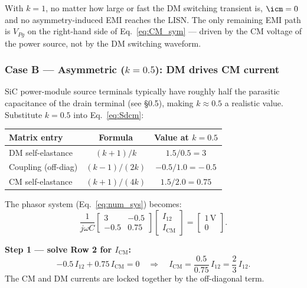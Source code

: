 \begin{statebox}
With $k = 1$, no matter how large or fast the DM switching
transient is, $\icm = 0$ and no asymmetry-induced EMI reaches the
LISN.  The only remaining EMI path is $V_{Pg}$ on the right-hand
side of Eq.~\eqref{eq:CM_sym} — driven by the CM voltage of the
power source, not by the DM switching waveform.
\end{statebox}

\subsubsection*{Case B — Asymmetric ($k = 0.5$): DM drives CM current}

SiC power-module source terminals typically have roughly half the
parasitic capacitance of the drain terminal (see \S0.5), making
$k \approx 0.5$ a realistic value.
Substitute $k = 0.5$ into Eq.~\eqref{eq:Sdcm}:

\begin{center}
\renewcommand{\arraystretch}{1.5}
\begin{tabular}{lcc}
\toprule
Matrix entry & Formula & Value at $k = 0.5$ \\
\midrule
DM self-elastance  & $(k+1)/k$    & $1.5/0.5 = 3$ \\
Coupling (off-diag) & $(k-1)/(2k)$ & $-0.5/1.0 = -\,0.5$ \\
CM self-elastance  & $(k+1)/(4k)$ & $1.5/2.0 = 0.75$ \\
\bottomrule
\end{tabular}
\end{center}

The phasor system (Eq.~\ref{eq:num_sys}) becomes:
\[
\frac{1}{j\omega C}
\begin{bmatrix} 3 & -0.5 \\ -0.5 & 0.75 \end{bmatrix}
\begin{bmatrix} I_{12} \\ I_{\mathrm{CM}} \end{bmatrix}
=
\begin{bmatrix} 1\,\mathrm{V} \\ 0 \end{bmatrix}.
\]

\textbf{Step 1 — solve Row 2 for $I_{\mathrm{CM}}$:}
\[
    -0.5\,I_{12} + 0.75\,I_{\mathrm{CM}} = 0
    \quad\Longrightarrow\quad
    I_{\mathrm{CM}} = \frac{0.5}{0.75}\,I_{12} = \frac{2}{3}\,I_{12}.
\]
The CM and DM currents are locked together by the off-diagonal term.

